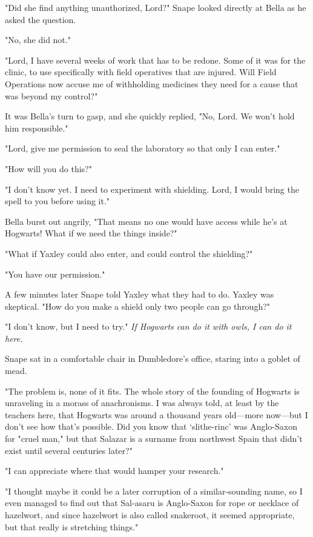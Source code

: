 "Did she find anything unauthorized, Lord?" Snape looked directly at Bella as he asked the question.

"No, she did not."

"Lord, I have several weeks of work that has to be redone. Some of it was for the clinic, to use specifically with field operatives that are injured. Will Field Operations now accuse me of withholding medicines they need for a cause that was beyond my control?"

It was Bella's turn to gasp, and she quickly replied, "No, Lord. We won't hold him responsible."

"Lord, give me permission to seal the laboratory so that only I can enter."

"How will you do this?"

"I don't know yet. I need to experiment with shielding. Lord, I would bring the spell to you before using it."

Bella burst out angrily, "That means no one would have access while he's at Hogwarts! What if we need the things inside?"

"What if Yaxley could also enter, and could control the shielding?"

"You have our permission."

A few minutes later Snape told Yaxley what they had to do. Yaxley was skeptical. "How do you make a shield only two people can go through?"

"I don't know, but I need to try." \emph{If Hogwarts can do it with owls, I can do it here.}

\sbreak

Snape sat in a comfortable chair in Dumbledore's office, staring into a goblet of mead.

"The problem is, none of it fits. The whole story of the founding of Hogwarts is unraveling in a morass of anachronisms. I was always told, at least by the teachers here, that Hogwarts was around a thousand years old—more now—but I don't see how that's possible. Did you know that `slithe-rinc' was Anglo-Saxon for "cruel man," but that Salazar is a surname from northwest Spain that didn't exist until several centuries later?"

"I can appreciate where that would hamper your research."

"I thought maybe it could be a later corruption of a similar-sounding name, so I even managed to find out that Sal-asaru is Anglo-Saxon for rope or necklace of hazelwort, and since hazelwort is also called snakeroot, it seemed appropriate, but that really is stretching things."

